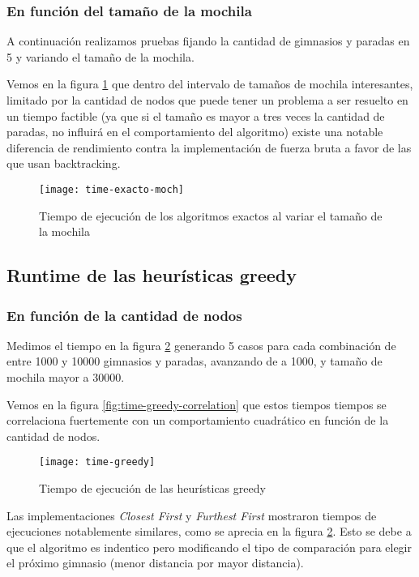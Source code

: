 \subsubsection{En función del tamaño de la mochila}

A continuación realizamos pruebas fijando la cantidad de gimnasios y paradas en 5 y variando el tamaño de la mochila.

Vemos en la figura \ref{fig:time-exacto-moch} que dentro del intervalo de tamaños de mochila
interesantes, limitado por la cantidad de nodos que puede tener un problema a ser resuelto en un tiempo factible
(ya que si el tamaño es mayor a tres veces la cantidad de paradas, no influirá en el comportamiento del algoritmo) existe una notable diferencia de rendimiento contra la implementación de fuerza bruta a favor de las que usan backtracking.

\begin{figure}[H]
    \centering
    \texttt{[image: time-exacto-moch]}
    \caption{Tiempo de ejecución de los algoritmos exactos al variar el tamaño de la mochila}
    \label{fig:time-exacto-moch}
\end{figure}

\subsection{Runtime de las heurísticas greedy}

\subsubsection{En función de la cantidad de nodos}

Medimos el tiempo en la figura \ref{fig:time-greedy} generando 5 casos para cada combinación de entre 1000 y 10000 gimnasios y paradas, avanzando de a 1000, y tamaño de mochila mayor a 30000.

Vemos en la figura \ref{fig:time-greedy-correlation} que estos tiempos tiempos se correlaciona fuertemente con un comportamiento cuadrático en función de la cantidad de nodos.

\begin{figure}[H]
    \centering
    \texttt{[image: time-greedy]}
    \caption{Tiempo de ejecución de las heurísticas greedy}
    \label{fig:time-greedy}
\end{figure}

Las implementaciones \emph{Closest First} y \emph{Furthest First} mostraron tiempos de ejecuciones notablemente similares, como se aprecia en la figura \ref{fig:time-greedy}. Esto se debe a que el algoritmo es indentico pero modificando el tipo de comparación para elegir el próximo gimnasio (menor distancia por mayor distancia).

